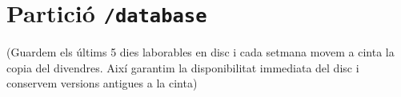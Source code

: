 
\section{Partició \texttt{/database}}%
\label{sec:part_opt}

\begin{itemize}
     (Guardem els últims 5 dies laborables en disc i cada setmana movem a cinta la copia del divendres. Així garantim la disponibilitat immediata del disc i conservem versions antigues a la cinta)
\end{itemize}
